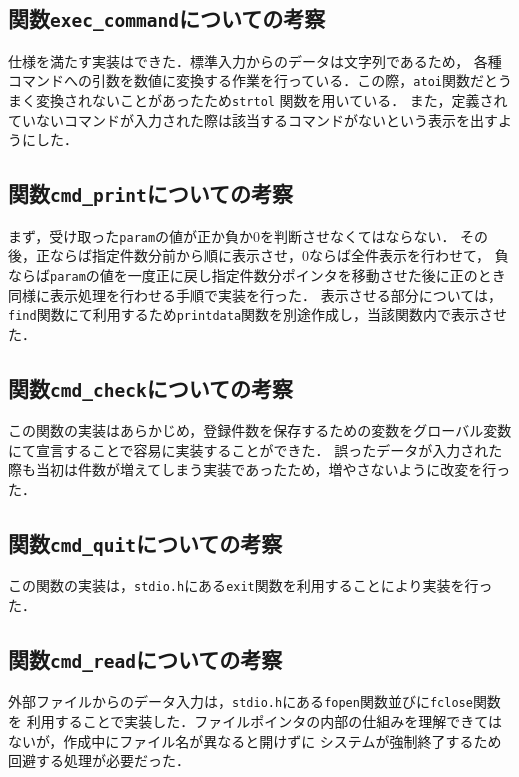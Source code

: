 \documentclass[a4j,11pt]{jarticle}
\begin{document}
\subsection{関数\texttt{exec\_command}についての考察}
仕様を満たす実装はできた．標準入力からのデータは文字列であるため，
各種コマンドへの引数を数値に変換する作業を行っている．この際，\verb|atoi|関数だとうまく変換されないことがあったため\verb|strtol|
関数を用いている．
また，定義されていないコマンドが入力された際は該当するコマンドがないという表示を出すようにした．

\subsection{関数\texttt{cmd\_print}についての考察}
まず，受け取った\verb|param|の値が正か負か$0$を判断させなくてはならない．
その後，正ならば指定件数分前から順に表示させ，$0$ならば全件表示を行わせて，
負ならば\verb|param|の値を一度正に戻し指定件数分ポインタを移動させた後に正のとき同様に表示処理を行わせる手順で実装を行った．
表示させる部分については，\verb|find|関数にて利用するため\verb|printdata|関数を別途作成し，当該関数内で表示させた．
\subsection{関数\texttt{cmd\_check}についての考察}
この関数の実装はあらかじめ，登録件数を保存するための変数をグローバル変数にて宣言することで容易に実装することができた．
誤ったデータが入力された際も当初は件数が増えてしまう実装であったため，増やさないように改変を行った．

\subsection{関数\texttt{cmd\_quit}についての考察}
この関数の実装は，\verb|stdio.h|にある\verb|exit|関数を利用することにより実装を行った．

\subsection{関数\texttt{cmd\_read}についての考察}
外部ファイルからのデータ入力は，\verb|stdio.h|にある\verb|fopen|関数並びに\verb|fclose|関数を
利用することで実装した．ファイルポインタの内部の仕組みを理解できてはないが，作成中にファイル名が異なると開けずに
システムが強制終了するため回避する処理が必要だった．
\end{document}

